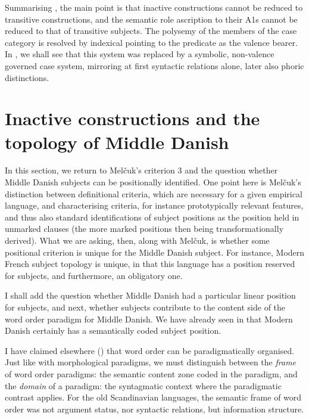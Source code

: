 \documentclass[output=paper]{langscibook}
\begin{document}
Summarising , the main point is that inactive constructions cannot be reduced to transitive constructions, and the semantic role ascription to their A1s cannot be reduced to that of transitive subjects. The polysemy of the members of the case category is resolved by indexical pointing to the predicate as the valence bearer. In , we shall see that this system was replaced by a symbolic, non-valence governed case system, mirroring at first syntactic relations alone, later also phoric distinctions.

\section{Inactive constructions and the topology of Middle Danish} \label{heltoft:4}

In this section, we return to Melčuk's criterion 3 \citep{Melčuk2014} and the question whether Middle Danish subjects can be positionally identified. One point here is Melčuk's distinction between definitional criteria, which are necessary for a given empirical language, and characterising criteria, for instance prototypically relevant features, and thus also standard identifications of subject positions as the position held in unmarked clauses (the more marked positions then being transformationally derived). What we are asking, then, along with Melčuk, is whether some positional criterion is unique for the Middle Danish subject. For instance, Modern French subject topology is unique, in that this language has a position reserved for subjects, and furthermore, an obligatory one. 

I shall add the question whether Middle Danish had a particular linear position for subjects, and next, whether subjects contribute to the content side of the word order paradigm for Middle Danish. We have already seen in  that Modern Danish certainly has a semantically coded subject position. 

I have claimed elsewhere (\citealt{Heltoft2003, Heltoft2003, Heltoft2011, Nørgård-Sørensen2015}) that word order can be paradigmatically organised. Just like with morphological paradigms, we must distinguish between the \textit{frame} of word order paradigms: the semantic content zone coded in the paradigm, and the \textit{domain} of a paradigm: the syntagmatic context where the paradigmatic contrast applies. For the old Scandinavian languages, the semantic frame of word order was not argument status, nor syntactic relations, but information structure. 
\end{document}
